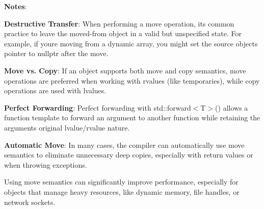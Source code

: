 {\bfseries{Notes}}\+:


\begin{DoxyEnumerate}
\item {\bfseries{Destructive Transfer}}\+: When performing a move operation, it\textquotesingle{}s common practice to leave the moved-\/from object in a valid but unspecified state. For example, if you\textquotesingle{}re moving from a dynamic array, you might set the source object\textquotesingle{}s pointer to {\ttfamily nullptr} after the move.
\item {\bfseries{Move vs. Copy}}\+: If an object supports both move and copy semantics, move operations are preferred when working with rvalues (like temporaries), while copy operations are used with lvalues.
\item {\bfseries{Perfect Forwarding}}\+: Perfect forwarding with {\ttfamily std\+::forward\texorpdfstring{$<$}{<}T\texorpdfstring{$>$}{>}()} allows a function template to forward an argument to another function while retaining the argument\textquotesingle{}s original lvalue/rvalue nature.
\item {\bfseries{Automatic Move}}\+: In many cases, the compiler can automatically use move semantics to eliminate unnecessary deep copies, especially with return values or when throwing exceptions.
\end{DoxyEnumerate}

Using move semantics can significantly improve performance, especially for objects that manage heavy resources, like dynamic memory, file handles, or network sockets. 